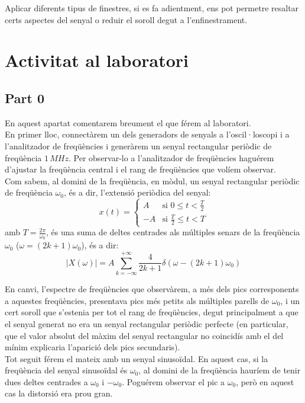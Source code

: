 \documentclass[11pt,a4]{article}
\numberwithin{equation}{section}
\theoremstyle{thmstyle}
\theoremstyle{thmstyle}
\theoremstyle{thmstyle}
\theoremstyle{thmstyle}
\theoremstyle{thmstyle}
\theoremstyle{thmstyle}
\theoremstyle{thmstyle}
\begin{document}
Aplicar diferents tipus de finestres, si es fa adientment, ens pot permetre resaltar certs aspectes del senyal o reduir el soroll degut a l'enfinestrament.

\section{Activitat al laboratori}

\subsection{Part 0}

En aquest apartat comentarem breument el que férem al laboratori.
\\

En primer lloc, connectàrem un dels generadors de senyals a l'oscil·loscopi i a l'analitzador de freqüències  i generàrem un senyal rectangular periòdic de freqüència $1\,MHz$. Per observar-lo a l'analitzador de freqüències haguérem d'ajustar la freqüència central i el rang de freqüències que volíem observar. 
\\

Com sabem, al domini de la freqüència, en mòdul, un senyal rectangular periòdic de freqüència $\omega_0$, és a dir, l'extensió periòdica del senyal:
$$
x(t) = 
\begin{cases}
A        & \text{si $0\leqslant t<\frac{T}{2}$} \\
-A       & \text{si $\frac{T}{2}\leqslant t<T$}
\end{cases}
$$
amb $T=\frac{2\pi}{\omega_0}$, és una suma de deltes centrades als múltiples senars de la freqüència $\omega_0$ ($\omega = (2k+1)\omega_0$), és a dir:
$$
\vert X(\omega)\vert = A\sum_{k = -\infty}^{+\infty} \frac{4}{2k+1}\delta(\omega-(2k+1)\omega_0)
$$

En canvi, l'espectre de freqüències que observàrem, a més dels pics corresponents a aquestes freqüències, presentava pics més petits als múltiples parells de $\omega_0$, i un cert soroll que s'estenia per tot el rang de freqüències, degut principalment a que el senyal generat no era un senyal rectangular periòdic perfecte (en particular, que el valor absolut del màxim del senyal rectangular no coincidís amb el del mínim explicaria l'aparició dels pics secundaris).
\\

Tot seguit férem el mateix amb un senyal sinusoïdal. En aquest cas, si la freqüència del senyal sinusoïdal és $\omega_0$, al domini de la freqüència hauríem de tenir dues deltes centrades a $\omega_0$ i $-\omega_0$.  Poguérem observar el pic a $\omega_0$, però en aquest cas la distorsió era prou gran.
\\
\end{document}
